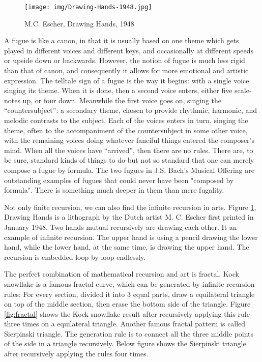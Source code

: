 \documentclass{article}
\begin{document}
\begin{figure}[htbp]
 \centering
 \texttt{[image: img/Drawing-Hands-1948.jpg]}
 \caption{M.C. Escher, Drawing Hands, 1948}
 \label{fig:Drawing-Hands}
\end{figure}

A fugue is like a canon, in that it is usually based on one theme which gets played in different voices and different keys, and occasionally at different speeds or upside down or backwards. However, the notion of fugue is much less rigid than that of canon, and consequently it allows for more emotional and artistic expression. The telltale sign of a fugue is the way it begins: with a single voice singing its theme. When it is done, then a second voice enters, either five scale-notes up, or four down. Meanwhile the first voice goes on, singing the ``countersubject'': a secondary theme, chosen to provide rhythmic, harmonic, and melodic contrasts to the subject. Each of the voices enters in turn, singing the theme, often to the accompaniment of the countersubject in some other voice, with the remaining voices doing whatever fanciful things entered the composer's mind. When all the voices have ``arrived'', then there are no rules. There are, to be sure, standard kinds of things to do-but not so standard that one can merely compose a fugue by formula. The two fugues in J.S. Bach's Musical Offering are outstanding examples of fugues that could never have been "composed by formula". There is something much deeper in them than mere fugality\cite{GEB}.

Not only finite recursion, we can also find the infinite recursion in arts. Figure \ref{fig:Drawing-Hands}, Drawing Hands is a lithograph by the Dutch artist M. C. Escher first printed in January 1948. Two hands mutual recursively are drawing each other. It an example of infinite recursion. The upper hand is using a pencil drawing the lower hand, while the lower hand, at the same time, is drawing the upper hand. The recursion is embedded loop by loop endlessly.

The perfect combination of mathematical recursion and art is fractal. Kock snowflake is a famous fractal curve, which can be generated by infinite recursion rules: For every section, divided it into 3 equal parts, draw a equilateral triangle on top of the middle section, then erase the bottom side of the triangle. Figure \ref{fig:fractal} shows the Kock snowflake result after recursively applying this rule three times on a equilateral triangle. Another famous fractal pattern is called Sierpinski triangle. The generation rule is to connect all the three middle points of the side in a triangle recursively. Below figure shows the Sierpinski triangle after recursively applying the rules four times.
\end{document}
